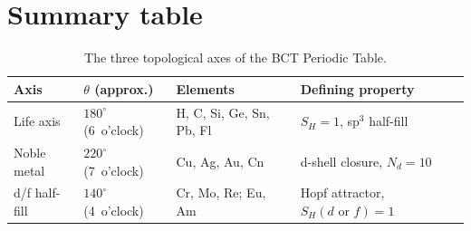 \documentclass[aps,prl,onecolumn,superscriptaddress]{revtex4-2}
\begin{document}
\section{Summary table}

\begin{table}[h]
\centering
\caption{The three topological axes of the BCT Periodic Table.}
\begin{tabular}{p{28mm}p{22mm}p{28mm}p{45mm}}
\toprule
Axis & $\theta$ (approx.) & Elements & Defining property \\
\midrule
Life axis & $180^\circ$ (6~o'clock) & H, C, Si, Ge, Sn, Pb, Fl
  & $S_H = 1$, sp$^3$ half-fill \\[4pt]
Noble metal & $220^\circ$ (7~o'clock) & Cu, Ag, Au, Cn
  & d-shell closure, $N_d = 10$ \\[4pt]
d/f half-fill & $140^\circ$ (4~o'clock) & Cr, Mo, Re; Eu, Am
  & Hopf attractor, $S_H(d\text{ or }f)=1$ \\
\bottomrule
\end{tabular}
\end{table}
\end{document}
